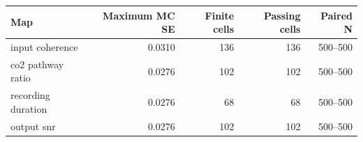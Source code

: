 \begin{tabular}{lrrrr}
\toprule
Map & Maximum MC SE & Finite cells & Passing cells & Paired N \\
\midrule
input coherence & 0.0310 & 136 & 136 & 500--500 \\
co2 pathway ratio & 0.0276 & 102 & 102 & 500--500 \\
recording duration & 0.0276 & 68 & 68 & 500--500 \\
output snr & 0.0276 & 102 & 102 & 500--500 \\
\bottomrule
\end{tabular}
